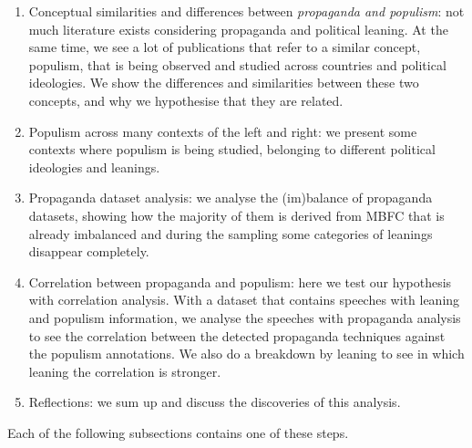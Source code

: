 \begin{enumerate}
    \item Conceptual similarities and differences between \textit{propaganda and populism}: not much literature exists considering propaganda and political leaning. At the same time, we see a lot of publications that refer to a similar concept, populism, that is being observed and studied across countries and political ideologies. We show the differences and similarities between these two concepts, and why we hypothesise that they are related.
    \item Populism across many contexts of the left and right: we present some contexts where populism is being studied, belonging to different political ideologies and leanings.
    \item Propaganda dataset analysis: we analyse the (im)balance of propaganda datasets, showing how the majority of them is derived from MBFC that is already imbalanced and during the sampling some categories of leanings disappear completely.
    \item Correlation between propaganda and populism: here we test our hypothesis with correlation analysis. With a dataset that contains speeches with leaning and populism information, we analyse the speeches with propaganda analysis to see the correlation between the detected propaganda techniques against the populism annotations. We also do a breakdown by leaning to see in which leaning the correlation is stronger.
    \item Reflections: we sum up and discuss the discoveries of this analysis.
\end{enumerate}

Each of the following subsections contains one of these steps.




